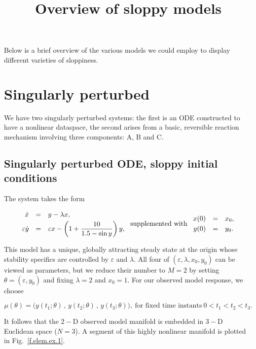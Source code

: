 \documentclass[11pt]{article}
\title{Overview of sloppy models}
\newcommand{\p}{\theta}
\newcommand{\eps}{\varepsilon}
\newcommand{\be}{\begin{equation}}
\newcommand{\ee}{\end{equation}}
\begin{document}
\maketitle

Below is a brief overview of the various models we could employ to display different varieties of sloppiness.

\section{Singularly perturbed}

We have two singularly perturbed systems: the first is an ODE
constructed to have a nonlinear dataspace, the second arises from a
basic, reversible reaction mechanism involving three components: A, B
and C.

\subsection{Singularly perturbed ODE, sloppy initial conditions}

The system takes the form

\be
\begin{array}{rcl}
 \dot{x} &=& y - \lambda x ,
\vspace*{1mm}\\
 \eps \dot{y} &=& \eps x - \displaystyle\left(1+\frac{10}{1.5-\sin y}\right) y ,
\end{array}
\ \mbox{supplemented with} \
\begin{array}{rcl}
 x(0) &=& x_0 ,
\vspace*{1mm}\\
 y(0) &=& y_0 .
\end{array}
\label{elem-ODE}
\ee

This model has a unique, globally attracting steady state at the
origin whose stability specifics are controlled by $\eps$ and
$\lambda$.  All four of $(\eps,\lambda,x_0,y_0)$ can be viewed as
parameters, but we reduce their number to $M=2$ by setting
$\p = (\eps,y_0)$ and fixing $\lambda= 2$ and $x_0 = 1$.  For our
observed model response, we choose

\be
 \mu(\p) = \big( y(t_1;\p) \,,\, y(t_2;\p) \,,\, y(t_3;\p) \big) ,
\ \mbox{for fixed time instants} \
 0 < t_1 < t_2 < t_3 .
\label{elem-mu}
\ee

It follows that the $2-$D observed model manifold is embedded in $3-$D
Euclidean space ($N=3$).  A segment of this highly nonlinear manifold
is plotted in Fig.~\ref{f.elem.ex.1}. \\
\end{document}
